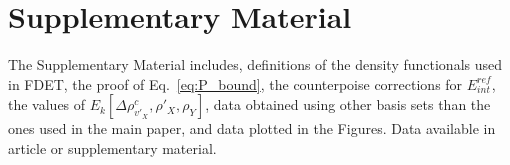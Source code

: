 \documentclass[amsmath,amssymb,preprint,aip,jcp]{revtex4-1}
\begin{document}
\section*{Supplementary Material}
The Supplementary Material includes, {\color{red}definitions of the density functionals used in FDET, 
the proof of Eq.~\ref{eq:P_bound}, the counterpoise corrections for $E_{int}^{ref}$, the values of $E_k[\Delta \rho^{c}_{v'_X}, \rho'_X, \rho_Y]$, data obtained using other basis sets than the ones used in the main paper,} and data plotted in the Figures.
Data available in article or supplementary material.

\end{document}

